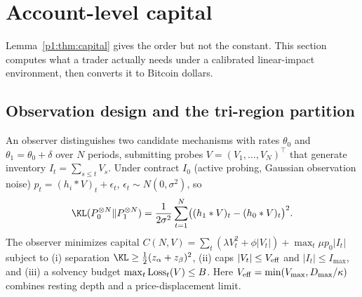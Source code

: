 \section{Account-level capital}\label{p1:sec:account}

Lemma~\ref{p1:thm:capital} gives the order but not the constant. This section computes what a trader actually needs under a calibrated linear-impact environment, then converts it to Bitcoin dollars.

\subsection{Observation design and the tri-region partition}

An observer distinguishes two candidate mechanisms with rates $\theta_0$ and $\theta_1=\theta_0+\delta$ over $N$ periods, submitting probes $V=(V_1,\ldots,V_N)^\top$ that generate inventory $I_t=\sum_{s\le t}V_s$. Under contract $I_0$ (active probing, Gaussian observation noise) $p_t=(h_i*V)_t+\epsilon_t$, $\epsilon_t\sim N(0,\sigma^2)$, so
\begin{equation}\label{p1:eq:klconv}
\KL(P_0^{\otimes N}\|P_1^{\otimes N})=\frac1{2\sigma^2}\sum_{t=1}^N\bigl((h_1*V)_t-(h_0*V)_t\bigr)^2 .
\end{equation}
The observer minimizes capital $C(N,V)=\sum_t(\lambda V_t^2+\phi|V_t|)+\max_t\mu p_0|I_t|$ subject to (i) separation $\KL\ge\tfrac12(z_\alpha+z_\beta)^2$, (ii) caps $|V_t|\le V_{\rm eff}$ and $|I_t|\le I_{\max}$, and (iii) a solvency budget $\max_t{\rm Loss}_t(V)\le B$. Here $V_{\rm eff}=\min(V_{\max},D_{\max}/\kappa)$ combines resting depth and a price-displacement limit.

